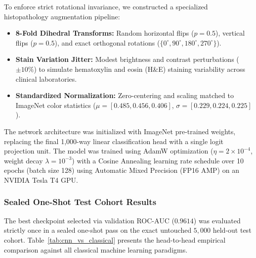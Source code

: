 \documentclass[11pt,a4paper]{article}
\begin{document}
To enforce strict rotational invariance, we constructed a specialized histopathology augmentation pipeline:
\begin{itemize}[noitemsep,leftmargin=*]
    \item \textbf{8-Fold Dihedral Transforms:} Random horizontal flips ($p=0.5$), vertical flips ($p=0.5$), and exact orthogonal rotations ($\{0^\circ, 90^\circ, 180^\circ, 270^\circ\}$).
    \item \textbf{Stain Variation Jitter:} Modest brightness and contrast perturbations ($\pm 10\%$) to simulate hematoxylin and eosin (H\&E) staining variability across clinical laboratories.
    \item \textbf{Standardized Normalization:} Zero-centering and scaling matched to ImageNet color statistics ($\mu = [0.485, 0.456, 0.406]$, $\sigma = [0.229, 0.224, 0.225]$).
\end{itemize}

The network architecture was initialized with ImageNet pre-trained weights, replacing the final 1,000-way linear classification head with a single logit projection unit. The model was trained using AdamW optimization ($\eta = 2 \times 10^{-4}$, weight decay $\lambda = 10^{-3}$) with a Cosine Annealing learning rate schedule over 10 epochs (batch size 128) using Automatic Mixed Precision (FP16 AMP) on an NVIDIA Tesla T4 GPU.

\subsubsection{Sealed One-Shot Test Cohort Results}
The best checkpoint selected via validation ROC-AUC ($0.9614$) was evaluated strictly once in a sealed one-shot pass on the exact untouched $5,000$ held-out test cohort. Table~\ref{tab:cnn_vs_classical} presents the head-to-head empirical comparison against all classical machine learning paradigms.
\end{document}
